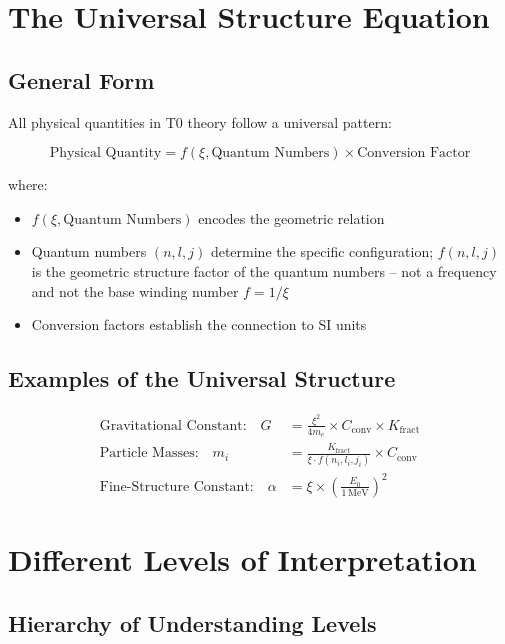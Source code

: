 	\section{The Universal Structure Equation}
	
	\subsection{General Form}
	
	All physical quantities in T0 theory follow a universal pattern:
	
	\begin{equation}
		\boxed{\text{Physical Quantity} = f(\xi, \text{Quantum Numbers}) \times \text{Conversion Factor}}
		\label{eq:universal_pattern}
	\end{equation}
	
	where:
	\begin{itemize}
		\item $f(\xi, \text{Quantum Numbers})$ encodes the geometric relation
		\item Quantum numbers $(n,l,j)$ determine the specific configuration; $f(n,l,j)$ is the geometric structure factor of the quantum numbers -- not a frequency and not the base winding number $f = 1/\xi$
		\item Conversion factors establish the connection to SI units
	\end{itemize}
	
	\subsection{Examples of the Universal Structure}
	
	\begin{align}
		\text{Gravitational Constant:} \quad G &= \frac{\xi^2}{4m_e} \times C_{\text{conv}} \times K_{\text{fract}} \\
		\text{Particle Masses:} \quad m_i &= \frac{K_{\text{fract}}}{\xi \cdot f(n_i,l_i,j_i)} \times C_{\text{conv}} \\
		\text{Fine-Structure Constant:} \quad \alpha &= \xi \times \left(\frac{E_0}{1\,\mathrm{MeV}}\right)^2
	\end{align}
	
	\section{Different Levels of Interpretation}
	
	\subsection{Hierarchy of Understanding Levels}
	
